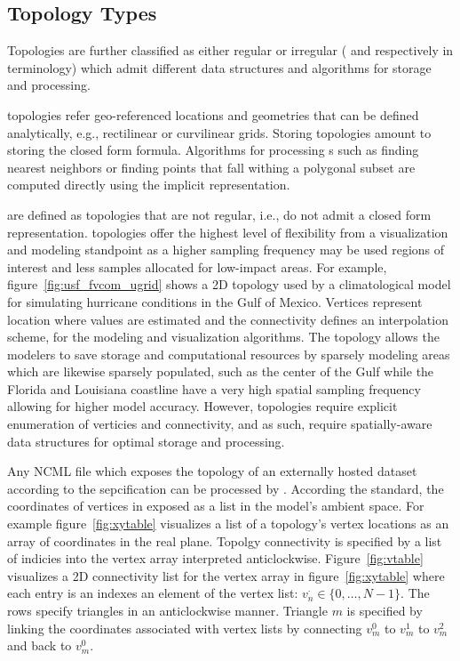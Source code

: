 \subsection{Topology Types}
Topologies are further classified as either regular or irregular ({\bf
  \cgrid{}} and {\bf \ugrid} respectively in \sciwms{} terminology)
which admit different data structures and algorithms for storage and
processing.

{\bf \cgrid{}} topologies refer geo-referenced locations and
geometries that can be defined analytically, e.g., rectilinear or
curvilinear grids. Storing \cgrid{} topologies amount to storing the
closed form formula. Algorithms for processing \cgrid{}s such as
finding nearest neighbors or finding points that fall withing a
polygonal subset are computed directly using the implicit \cgrid{}
representation.

{\bf \ugrid{}} are defined as topologies that are not regular, i.e.,
do not admit a closed form representation. \ugrid{} topologies offer
the highest level of flexibility from a visualization and modeling
standpoint as a higher sampling frequency may be used regions of
interest and less samples allocated for low-impact areas. For example,
figure~\ref{fig:usf_fvcom_ugrid} shows a \ugrid{} 2D topology used by
a climatological model for simulating hurricane conditions in the Gulf
of Mexico. Vertices represent location where values are estimated and
the connectivity defines an interpolation scheme, for the modeling and
visualization algorithms. The \ugrid{} topology allows the modelers to
save storage and computational resources by sparsely modeling areas
which are likewise sparsely populated, such as the center of the Gulf
while the Florida and Louisiana coastline have a very high spatial
sampling frequency allowing for higher model accuracy. However,
\ugrid{} topologies require explicit enumeration of verticies and
connectivity, and as such, require spatially-aware data structures for
optimal storage and processing.

Any NCML file which exposes the topology of an externally hosted
dataset according to the \cfugrid{} sepcification can be processed by
\sciwms{}. According the \cfugrid{} standard, the coordinates of
vertices in exposed as a list in the model's ambient space. For
example figure~\ref{fig:xytable} visualizes a list of a topology's
vertex locations as an array of coordinates in the real plane. Topolgy
connectivity is specified by a list of indicies into the vertex array
interpreted anticlockwise. Figure~\ref{fig:vtable} visualizes a 2D
connectivity list for the vertex array in figure~\ref{fig:xytable}
where each entry is an indexes an element of the vertex list:
$v_n^{\cdot}\in \{0,\ldots,N-1\}$. The rows specify triangles in an
anticlockwise manner. Triangle $m$ is specified by linking the
coordinates associated with vertex lists by connecting $v^0_m$ to
$v^1_m$ to $v^2_m$ and back to $v^0_m$.

